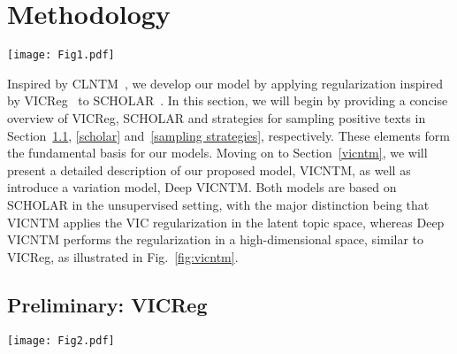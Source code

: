 \documentclass{article}
\begin{document}
\section{Methodology}\label{sec3}
\begin{figure*}[ht]
    \centering
    \texttt{[image: Fig1.pdf]}
    \caption{{\bf Illustration of VICNTM and Deep VICNTM.} \textbf{\textit{VICNTM}}: components connected by red solid arrows. \textbf{\textit{Deep VICNTM}}: components connected by blue dot arrows. Note that VICNTM performs regularization on the latent representation $\boldsymbol{Z}$ and $\boldsymbol{Z'}$, while Deep VICNTM performs regularization on the high-dimensional embeddings $\boldsymbol{Y}$ and $\boldsymbol{Y'}$} \label{fig:vicntm}
\end{figure*}

Inspired by CLNTM~\cite{nguyen2021contrastive}, we develop our model by applying regularization inspired by VICReg~\cite{bardes2022vicreg} to SCHOLAR~\cite{card2018neural}.
In this section, we will begin by providing a concise overview of VICReg, SCHOLAR and strategies for sampling positive texts in Section~\ref{vicreg}, \ref{scholar} and~\ref{sampling strategies}, respectively. 
These elements form the fundamental basis for our models. 
Moving on to Section~\ref{vicntm}, we will present a detailed description of our proposed model, VICNTM, as well as introduce a variation model, Deep VICNTM.
Both models are based on SCHOLAR in the unsupervised setting, with the major distinction being that VICNTM applies the VIC regularization in the latent topic space, whereas Deep VICNTM performs the regularization in a high-dimensional space, similar to VICReg, as illustrated in Fig.~\ref{fig:vicntm}.

\subsection{Preliminary: VICReg}\label{vicreg}
\begin{figure*}[ht]
    \centering
    \texttt{[image: Fig2.pdf]}
    \caption{{\bf Illustration of VICReg.} VICReg performs regularization on the high-dimensional embeddings $\boldsymbol{Y}$ and $\boldsymbol{Y'}$} \label{fig:vicreg}
\end{figure*}
\end{document}
